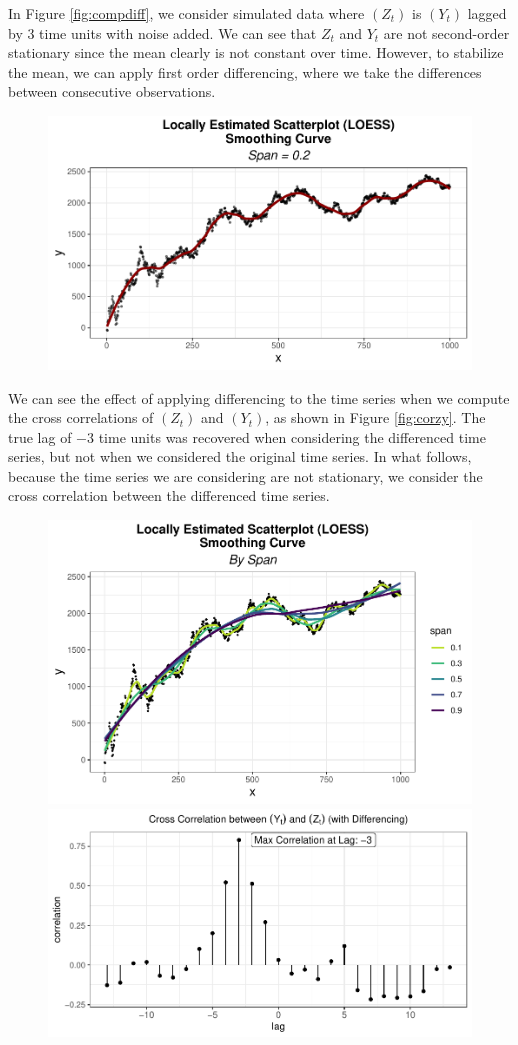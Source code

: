 \documentclass[12pt,twoside]{smiththesis}
\begin{document}
In Figure \ref{fig:compdiff}, we consider simulated data where \((Z_t)\) is \((Y_t)\) lagged by 3 time units with noise added. We can see that \(Z_t\) and \(Y_t\) are not second-order stationary since the mean clearly is not constant over time. However, to stabilize the mean, we can apply first order differencing, where we take the differences between consecutive observations.
\begin{figure}
\includegraphics[width=1\linewidth]{thesis_files/figure-latex/unnamed-chunk-18-1} \caption{\label{fig:compdiff}}\label{fig:unnamed-chunk-18}
\end{figure}
We can see the effect of applying differencing to the time series when we compute the cross correlations of \((Z_t)\) and \((Y_t)\), as shown in Figure \ref{fig:corzy}. The true lag of \(-3\) time units was recovered when considering the differenced time series, but not when we considered the original time series. In what follows, because the time series we are considering are not stationary, we consider the cross correlation between the differenced time series.
\vspace{5 cm}
\begin{figure}
\includegraphics[width=0.45\linewidth]{thesis_files/figure-latex/unnamed-chunk-19-1} \includegraphics[width=0.45\linewidth]{thesis_files/figure-latex/unnamed-chunk-19-2} \caption{\label{fig:corzy}}\label{fig:unnamed-chunk-19}
\end{figure}
\end{document}

